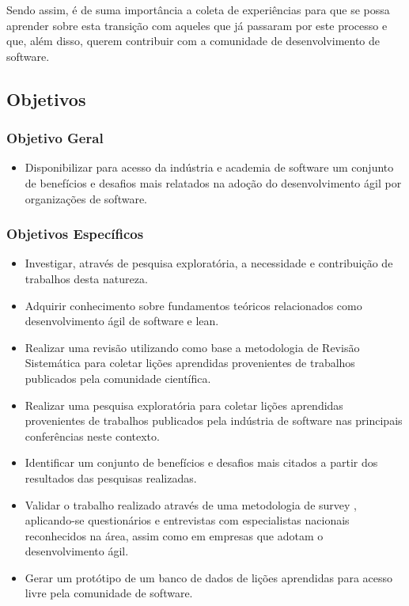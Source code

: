 \documentclass[a4paper,11pt]{article}
\begin{document}
Sendo assim, é de suma importância a coleta de experiências para que se possa aprender sobre esta transição com aqueles que já passaram por este processo e que, além disso, querem contribuir com a comunidade de desenvolvimento de software.
\subsection{Objetivos}
\subsubsection{Objetivo Geral}
\begin{itemize}
	\item Disponibilizar para acesso da indústria e academia de software um conjunto de benefícios e desafios mais relatados na adoção do desenvolvimento ágil por organizações de software.
\end{itemize}
\subsubsection{Objetivos Específicos}
\begin{itemize}
	\item Investigar, através de pesquisa exploratória, a necessidade e contribuição de trabalhos desta natureza.
	\item Adquirir conhecimento sobre fundamentos teóricos relacionados como desenvolvimento ágil de software e lean.
	\item Realizar uma revisão utilizando como base a metodologia de Revisão Sistemática \cite{Barbara2004} para coletar lições aprendidas provenientes de trabalhos publicados pela comunidade científica.
	\item Realizar uma pesquisa exploratória para coletar lições aprendidas provenientes de trabalhos publicados pela indústria de software nas principais conferências neste contexto.
	\item Identificar um conjunto de benefícios e desafios mais citados a partir dos resultados das pesquisas realizadas.
	\item Validar o trabalho realizado através de uma metodologia de survey \cite{Babbie1990}, aplicando-se questionários e entrevistas com especialistas nacionais reconhecidos na área, assim como em empresas que adotam o desenvolvimento ágil.
	\item Gerar um protótipo de um banco de dados de lições aprendidas para acesso livre pela comunidade de software.
\end{itemize}
\end{document}
